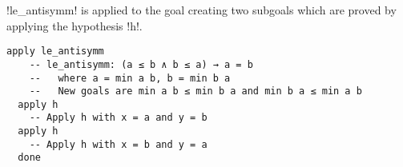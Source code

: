 !le_antisymm! is applied to the goal creating two subgoals which are proved by applying the hypothesis !h!.

\begin{Verbatim}[firstnumber=last]
  apply le_antisymm
    -- le_antisymm: (a ≤ b ∧ b ≤ a) → a = b
    --   where a = min a b, b = min b a
    --   New goals are min a b ≤ min b a and min b a ≤ min a b
  apply h
    -- Apply h with x = a and y = b
  apply h
    -- Apply h with x = b and y = a
  done
\end{Verbatim}


